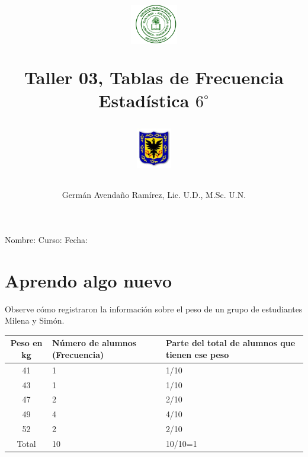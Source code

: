 \documentclass[10pt,twoside]{article}
\author{Germ\'an Avenda\~no Ram\'irez, Lic. U.D., M.Sc. U.N.}
\title{\begin{minipage}{.2\textwidth}
\includegraphics[height=1.75cm]{Images/logo-colegio.png}\end{minipage}
\begin{minipage}{.55\textwidth}
\begin{center}
Taller 03, Tablas de Frecuencia  \\
Estadística $6^{\circ}$
\end{center}
\end{minipage}\hfill
\begin{minipage}{.2\textwidth}
\includegraphics[height=1.75cm]{Images/logo-sed.png} 
\end{minipage}}
\date{}
\begin{document}
\maketitle
Nombre: \hrulefill Curso: \underline{\hspace*{44pt}} Fecha: \underline{\hspace*{2.5cm}}
\section*{Aprendo algo nuevo}
Observe cómo registraron la información sobre el peso de un grupo de estudiantes Milena y Simón.
\begin{tabular}{|c|p{3.5cm}|p{5cm}|}
\hline 
Peso en kg & Número de alumnos (Frecuencia) & Parte del total de alumnos que tienen ese peso \\ 
\hline 
41 & 1 & 1/10 \\ 
\hline 
43 & 1 & 1/10 \\ 
\hline 
47 & 2 & 2/10 \\ 
\hline 
49 & 4 & 4/10 \\ 
\hline 
52 & 2 & 2/10 \\ 
\hline 
Total & 10 & 10/10=1 \\ 
\hline 
\end{tabular} 
\end{document}

